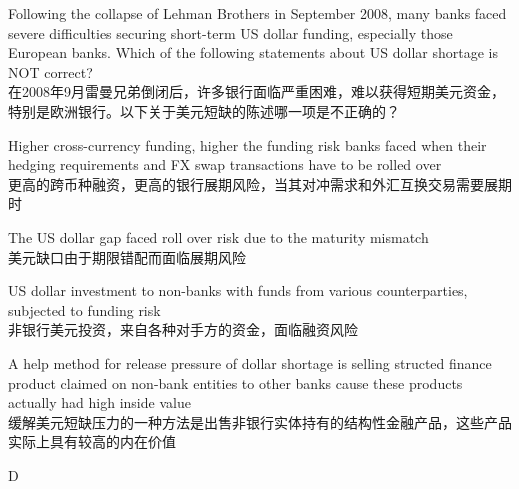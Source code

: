 \documentclass{article}
\newcounter{question} %
\begin{document}
\begin{question}
    Following the collapse of Lehman Brothers in September 2008, many banks faced severe difficulties securing short-term US dollar funding, especially those European banks. Which of the following statements about US dollar shortage is NOT correct?
    \\ 在2008年9月雷曼兄弟倒闭后，许多银行面临严重困难，难以获得短期美元资金，特别是欧洲银行。以下关于美元短缺的陈述哪一项是不正确的？
\end{question}

\begin{choices}
    \item Higher cross-currency funding, higher the funding risk banks faced when their hedging requirements and FX swap transactions have to be rolled over\\
    更高的跨币种融资，更高的银行展期风险，当其对冲需求和外汇互换交易需要展期时
    \item The US dollar gap faced roll over risk due to the maturity mismatch\\
    美元缺口由于期限错配而面临展期风险
    \item US dollar investment to non-banks with funds from various counterparties, subjected to funding risk\\
    非银行美元投资，来自各种对手方的资金，面临融资风险
    \item A help method for release pressure of dollar shortage is selling structed finance product claimed on non-bank entities to other banks cause these products actually had high inside value\\
    缓解美元短缺压力的一种方法是出售非银行实体持有的结构性金融产品，这些产品实际上具有较高的内在价值
\end{choices}

\begin{correctanswer}
    D
\end{correctanswer}
\end{document}
